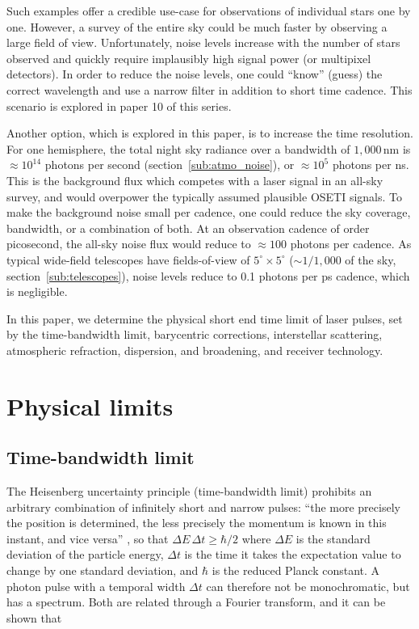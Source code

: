 \documentclass[twocolumn,tighten,longauthor]{myaastex62}
\begin{document}
Such examples offer a credible use-case for observations of individual stars one by one. However, a survey of the entire sky could be much faster by observing a large field of view. Unfortunately, noise levels increase with the number of stars observed and quickly require implausibly high signal power (or multipixel detectors). In order to reduce the noise levels, one could ``know'' (guess) the correct wavelength and use a narrow filter in addition to short time cadence. This scenario is explored in paper 10 of this series.

Another option, which is explored in this paper, is to increase the time resolution. For one hemisphere, the total night sky radiance over a bandwidth of $1{,}000\,$nm is $\approx 10^{14}$ photons per second (section~\ref{sub:atmo_noise}), or $\approx10^5$ photons per ns. This is the background flux which competes with a laser signal in an all-sky survey, and would overpower the typically assumed plausible OSETI signals. To make the background noise small per cadence, one could reduce the sky coverage, bandwidth, or a combination of both. At an observation cadence of order picosecond, the all-sky noise flux would reduce to $\approx 100$ photons per cadence. As typical wide-field telescopes have fields-of-view of $5^{\circ}\times5^{\circ}$ ($\sim 1/1{,}000$ of the sky, section~\ref{sub:telescopes}), noise levels reduce to 0.1 photons per ps cadence, which is negligible.

In this paper, we determine the physical short end time limit of laser pulses, set by the time-bandwidth limit, barycentric corrections, interstellar scattering, atmospheric refraction, dispersion, and broadening, and receiver technology.


\section{Physical limits}
\label{sec:physical}

\subsection{Time-bandwidth limit}
\label{sub:timebandwidth}
The Heisenberg uncertainty principle (time-bandwidth limit) prohibits an arbitrary combination of infinitely short and narrow pulses: ``the more precisely the position is determined, the less precisely the momentum is known in this instant, and vice versa'' \citep{Heisenberg1927}, so that
$\Delta E \, \Delta t \geq \hbar/2$ where $\Delta E$ is the standard deviation of the particle energy, $\Delta t$ is the time it takes the expectation value to change by one standard deviation, and $\hbar$ is the reduced Planck constant. A photon pulse with a temporal width $\Delta t$ can therefore not be monochromatic, but has a spectrum. Both are related through a Fourier transform, and it can be shown that \citep{Griffiths2004,Rulli2005}
\end{document}

